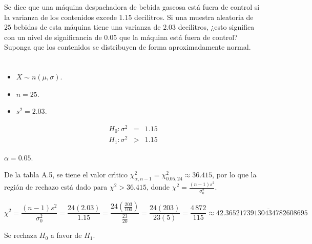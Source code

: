 \begin{enunciado}
 Se dice que una m\'aquina despachadora de bebida gaseosa est\'a fuera de control
 si la varianza de los contenidos excede $1.15$ decilitros.
 Si una muestra aleatoria de $25$ bebidas de esta m\'aquina tiene una varianza
 de $2.03$ decilitros, ¿esto significa con un nivel de significancia de $0.05$
 que la m\'aquina est\'a fuera de control?
 Suponga que los contenidos se distribuyen de forma aproximadamente normal.
\end{enunciado}

\begin{solucion}
 \begin{datos}
  $\phantom{0}$
  \begin{itemize}
   \item $X \sim n\left( \mu, \sigma \right)$.
   \item $n = 25$.
   \item $s^2 = 2.03$.
  \end{itemize}
 \end{datos}

 \begin{hipotesis}
  \begin{eqnarray*}
   H_0: \sigma^2 & = & 1.15 \\
   H_1: \sigma^2 & > & 1.15
  \end{eqnarray*}
 \end{hipotesis}

 \begin{significancia}
  $\alpha = 0.05$.
 \end{significancia}

 \begin{region}
  De la tabla A.5, se tiene el valor cr\'{\i}tico
  $\chi^2_{\alpha,n-1}=\chi^2_{0.05,24} \approx 36.415$,
  por lo que la regi\'on de rechazo est\'a dado para $\chi^2 > 36.415$,
  donde $\chi^2 = \frac{(n-1)s^2}{\sigma_0^2}$.
 \end{region}

 \begin{estadistico}
  \begin{equation*}
   \chi^2 = \frac{(n-1)s^2}{\sigma_0^2}
   = \frac{24(2.03)}{1.15}
   = \frac{24\left(\frac{203}{100} \right)}{\frac{23}{20}}
   = \frac{24(203)}{23(5)}
   = \frac{4\,872}{115} \approx 42.3\overline{6521739130434782608695}
  \end{equation*}
 \end{estadistico}

 \begin{decision}
  Se rechaza $H_0$ a favor de $H_1$.
 \end{decision}


\end{solucion}
